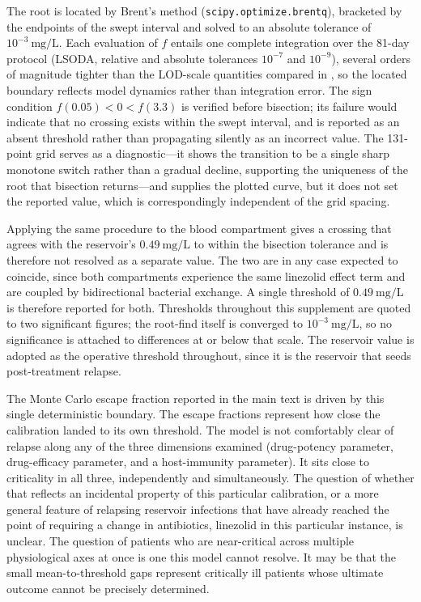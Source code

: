 \documentclass[11pt]{article}
\begin{document}
The root is located by Brent's method (\texttt{scipy.optimize.brentq}),
bracketed by the endpoints of the swept interval and solved to an absolute
tolerance of $10^{-3}~\mathrm{mg/L}$. Each evaluation of $f$ entails one
complete integration over the 81-day protocol (LSODA, relative and absolute
tolerances $10^{-7}$ and $10^{-9}$), several orders of magnitude tighter
than the LOD-scale quantities compared in , so the
located boundary reflects model dynamics rather than integration error. The
sign condition $f(0.05) < 0 < f(3.3)$ is verified before bisection; its
failure would indicate that no crossing exists within the swept interval,
and is reported as an absent threshold rather than propagating silently as
an incorrect value. The 131-point grid serves as a diagnostic---it shows the
transition to be a single sharp monotone switch rather than a gradual
decline, supporting the uniqueness of the root that bisection returns---and
supplies the plotted curve, but it does not set the reported value, which is
correspondingly independent of the grid spacing.

Applying the same procedure to the blood compartment gives a crossing that
agrees with the reservoir's $0.49~\mathrm{mg/L}$ to within the bisection
tolerance and is therefore not resolved as a separate value. The two are in
any case expected to coincide, since both compartments experience the same
linezolid effect term and are coupled by bidirectional bacterial exchange. A
single threshold of $0.49~\mathrm{mg/L}$ is therefore reported for both.
Thresholds throughout this supplement are quoted to two significant
figures; the root-find itself is converged to
$10^{-3}~\mathrm{mg/L}$, so no significance is attached to differences at
or below that scale. The reservoir value is
adopted as the operative threshold throughout, since it is the reservoir that
seeds post-treatment relapse.

The Monte Carlo escape fraction reported in the main text is driven by this
single deterministic boundary.
The escape fractions represent how close the calibration landed to
its own threshold. The model is not comfortably clear of
relapse along any of the three dimensions examined (drug-potency
parameter, drug-efficacy parameter, and a host-immunity parameter).
It sits close to criticality in all three, independently and
simultaneously. The question of whether that reflects an
incidental property of this particular calibration, or a more general
feature of relapsing reservoir infections that have already reached the
point of requiring a change in antibiotics, linezolid in this particular
instance, is unclear. The question of patients who are near-critical across
multiple physiological axes at once is one this model cannot resolve. It
may be that the small mean-to-threshold gaps represent critically ill
patients whose ultimate outcome cannot be precisely determined.
\end{document}
